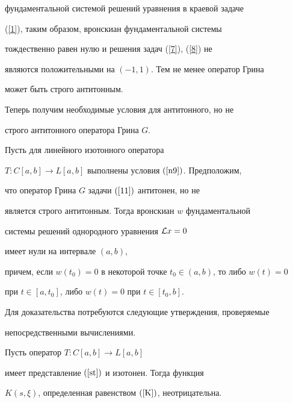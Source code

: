 фундаментальной системой решений уравнения в краевой задаче


(\ref{1}), таким образом, вронскиан фундаментальной системы


тождественно равен нулю и решения задач (\ref{7}), (\ref{8}) не


являются положительными на $(-1,1)$. Тем не менее оператор Грина


может быть строго антитонным.


\medskip





Теперь получим необходимые условия для антитонного, но не


строго антитонного оператора Грина $G$.





\begin{thms}\label{t7}


Пусть для линейного изотонного оператора


$T:C[a,b]\to L[a,b]$ выполнены условия $(\ref{n9})$. Предположим,


что оператор Грина $G$ задачи $(\ref{11})$ антитонен, но не


является строго антитонным. Тогда вронскиан $w$ фундаментальной


системы решений однородного уравнения ${\cal L} x=0$


имеет нули на интервале $(a,b)$,


причем, если $w(t_0)=0$ в некоторой точке $t_0\in(a,b)$, то либо $w(t)=0$


при $t\in[a,t_0]$, либо $w(t)=0$ при $t\in[t_0,b]$.


\end{thms}





Для доказательства потребуются следующие утверждения, проверяемые


непосредственными вычислениями.





\begin{lems}


\label{l3}


Пусть оператор $T:C[a,b]\to L[a,b]$


имеет представление $(\ref{st})$ и изотонен. Тогда функция


$K(s,\xi)$, определенная равенством $(\ref{K})$, неотрицательна.


\end{lems}





